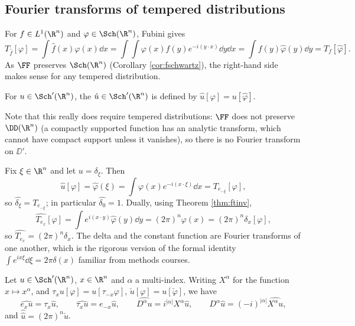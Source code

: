 \subsection{Fourier transforms of tempered distributions}

For $f \in L^1(\R^n)$ and $\varphi\in\Sch(\R^n)$, Fubini gives
$$T_{\hat f}[\varphi]=\int\hat f(x)\varphi(x)\dd x = \int\!\!\int \varphi(x)f(y)e^{-i(y\cdot x)}\dd y \dd x = \int f(y)\hat\varphi(y)\dd y = T_f[\hat\varphi].$$
As $\FF$ preserves $\Sch(\R^n)$ (Corollary \ref{cor:fschwartz}), the right-hand side makes sense for any tempered distribution.

\begin{definition}
	For $u \in \Sch'(\R^n)$, the  $\hat u \in \Sch'(\R^n)$ is defined by $\hat u[\varphi]=u[\hat\varphi]$.
\end{definition}

Note that this really does require tempered distributions: $\FF$ does not preserve $\DD(\R^n)$ (a compactly supported function has an analytic transform, which cannot have compact support unless it vanishes), so there is no Fourier transform on $\DD'$.

\begin{example}\label{ex:deltahat}
	Fix $\xi \in \R^n$ and let $u = \delta_\xi$. Then
	$$\hat u[\varphi]=\hat\varphi(\xi)=\int\varphi(x)e^{-i(x\cdot\xi)}\dd x = T_{e_{-\xi}}[\varphi],$$
	so $\hat{\delta_\xi}=T_{e_{-\xi}}$; in particular $\hat{\delta_0}=1$. Dually, using Theorem \ref{thm:ftinv},
	$$\widehat{T_{e_x}}[\varphi]=\int e^{i(x\cdot y)}\hat\varphi(y)\dd y = (2\pi)^n\varphi(x)=(2\pi)^n\delta_x[\varphi],$$
	so $\widehat{T_{e_x}}=(2\pi)^n\delta_x$. The delta and the constant function are Fourier transforms of one another, which is the rigorous version of the formal identity $\int e^{i x\xi}\dd\xi = 2\pi\delta(x)$ familiar from methods courses.
\end{example}

\begin{lemma}\label{lem:tempft}
	Let $u \in \Sch'(\R^n)$, $x\in\R^n$ and $\alpha$ a multi-index. Writing $X^\alpha$ for the function $x\mapsto x^\alpha$, and $\tau_xu[\varphi]=u[\tau_{-x}\varphi]$, $\check u[\varphi]=u[\check\varphi]$, we have
	$$\widehat{e_xu}=\tau_x\hat u, \qquad \widehat{\tau_xu}=e_{-x}\hat u, \qquad \widehat{D^\alpha u}=i^{|\alpha|}X^\alpha\hat u, \qquad D^\alpha\hat u = (-i)^{|\alpha|}\widehat{X^\alpha u},$$
	and $\hat{\hat u}=(2\pi)^n\check u$.
\end{lemma}

